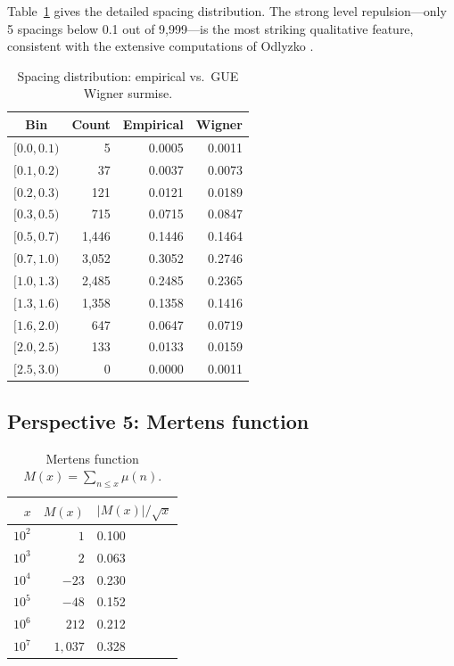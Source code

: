 \documentclass[11pt,a4paper]{article}
\theoremstyle{definition}
\begin{document}
Table~\ref{tab:spacing} gives the detailed spacing distribution. The strong level repulsion---only 5 spacings below 0.1 out of 9{,}999---is the most striking qualitative feature, consistent with the extensive computations of Odlyzko \cite{Odlyzko1987,Odlyzko2001}.

\begin{table}[H]
\centering
\caption{Spacing distribution: empirical vs.\ GUE Wigner surmise.}
\label{tab:spacing}
\begin{tabular}{@{}crrr@{}}
\toprule
Bin & Count & Empirical & Wigner \\
\midrule
$[0.0, 0.1)$ & 5     & 0.0005 & 0.0011 \\
$[0.1, 0.2)$ & 37    & 0.0037 & 0.0073 \\
$[0.2, 0.3)$ & 121   & 0.0121 & 0.0189 \\
$[0.3, 0.5)$ & 715   & 0.0715 & 0.0847 \\
$[0.5, 0.7)$ & 1{,}446 & 0.1446 & 0.1464 \\
$[0.7, 1.0)$ & 3{,}052 & 0.3052 & 0.2746 \\
$[1.0, 1.3)$ & 2{,}485 & 0.2485 & 0.2365 \\
$[1.3, 1.6)$ & 1{,}358 & 0.1358 & 0.1416 \\
$[1.6, 2.0)$ & 647   & 0.0647 & 0.0719 \\
$[2.0, 2.5)$ & 133   & 0.0133 & 0.0159 \\
$[2.5, 3.0)$ & 0     & 0.0000 & 0.0011 \\
\bottomrule
\end{tabular}
\end{table}

\subsection{Perspective 5: Mertens function}

\begin{table}[H]
\centering
\caption{Mertens function $M(x) = \sum_{n \leq x} \mu(n)$.}
\label{tab:mertens}
\begin{tabular}{@{}rrl@{}}
\toprule
$x$ & $M(x)$ & $|M(x)|/\sqrt{x}$ \\
\midrule
$10^2$     & $1$      & 0.100 \\
$10^3$     & $2$      & 0.063 \\
$10^4$     & $-23$    & 0.230 \\
$10^5$     & $-48$    & 0.152 \\
$10^6$     & $212$    & 0.212 \\
$10^7$     & $1{,}037$  & 0.328 \\
\bottomrule
\end{tabular}
\end{table}
\end{document}
